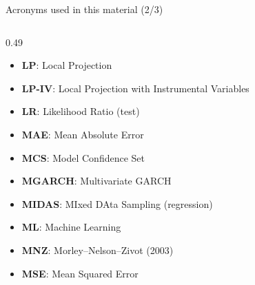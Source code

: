 \begin{frame}{Acronyms used in this material (2/3)}
\begin{columns}[T]
\begin{column}{0.49\textwidth}
\begin{itemize}
    \item \textbf{LP}: Local Projection
    \item \textbf{LP-IV}: Local Projection with Instrumental Variables
    \item \textbf{LR}: Likelihood Ratio (test)
    \item \textbf{MAE}: Mean Absolute Error
    \item \textbf{MCS}: Model Confidence Set
    \item \textbf{MGARCH}: Multivariate GARCH
    \item \textbf{MIDAS}: MIxed DAta Sampling (regression)
    \item \textbf{ML}: Machine Learning
    \item \textbf{MNZ}: Morley–Nelson–Zivot (2003)
    \item \textbf{MSE}: Mean Squared Error
\end{itemize}
\end{column}
\end{columns}
\end{frame}
